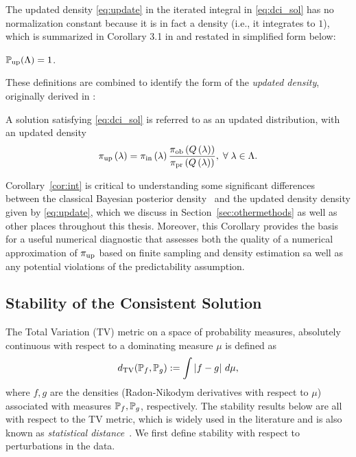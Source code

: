 The updated density \eqref{eq:update} in the iterated integral in \eqref{eq:dci_sol} has no normalization constant because it is in fact a density (i.e., it integrates to $1$), which is summarized in Corollary 3.1 in \cite{BJW18} and restated in simplified form below:
\begin{cor}\label{cor:int}
$\operatorname*{\mathbb{P}_{up}}({\Lambda}) = 1$.
\end{cor}

These definitions are combined to identify the form of the \emph{updated density}, originally derived in \cite{BJW18}:

\begin{defn}\label{defn:updated}
  A solution satisfying \eqref{eq:dci_sol} is referred to as an updated distribution, with an updated density
  \begin{equation}\label{eq:update}
    \operatorname*{\pi_{up}} \left ( \lambda \right ) = \operatorname*{\pi_{in}} \left ( \lambda \right ) \frac{\operatorname*{\pi_{ob}} \left ( Q\left ( \lambda \right ) \right ) }{\operatorname*{\pi_{pr}} \left ( Q\left ( \lambda \right ) \right ) }, \; \forall \; \lambda \in {\Lambda}.
  \end{equation}
\end{defn}

Corollary~\ref{cor:int} is critical to understanding some significant differences between the classical Bayesian posterior density~\cite{Smith} and the updated density density given by \eqref{eq:update}, which we discuss in Section~\ref{sec:othermethods} as well as other places throughout this thesis.
Moreover, this Corollary provides the basis for a useful numerical diagnostic that assesses both the quality of a numerical approximation of $\operatorname*{\pi_{up}}$ based on finite sampling and density estimation sa well as any potential violations of the predictability assumption.


\subsection{Stability of the Consistent Solution}\label{sec:stability}

The Total Variation (TV) metric on a space of probability measures, absolutely continuous with respect to a dominating measure $\mu$ is defined as
\begin{equation}\label{eq:tv}
d_{\text{TV}} (\mathbb{P}_f, \mathbb{P}_g) := \int \left\vert f - g\right\vert \, d\mu,
\end{equation}
where $f,g$ are the densities (Radon-Nikodym derivatives with respect to $\mu$) associated with measures $\mathbb{P}_f, \mathbb{P}_g$, respectively.
The stability results below are all with respect to the TV metric, which is widely used in the literature and is also known as \emph{statistical distance}~\cite{GS02, Smith, Silverman}.
We first define stability with respect to perturbations in the data.

